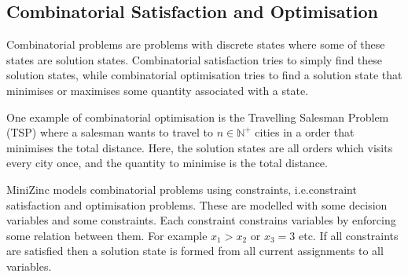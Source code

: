 \documentclass[a4paper,12pt]{article}
\newcommand{\elnaturale}{\mathbb{N}}
\begin{document}


\subsection{Combinatorial Satisfaction and Optimisation}\label{sec:csp}%
Combinatorial problems are problems with discrete states where some of these states are
solution states. Combinatorial satisfaction tries to simply find these solution states,
while combinatorial optimisation tries to find a solution state that minimises or
maximises some quantity associated with a state.

One example of combinatorial optimisation is the Travelling Salesman Problem (TSP) where a
salesman wants to travel to $n \in \elnaturale^+$ cities in a order that minimises the total
distance. Here, the solution states are all orders which visits every city once, and the
quantity to minimise is the total distance.

MiniZinc models combinatorial problems using constraints, i.e.\@ constraint satisfaction
and optimisation problems. These are modelled with some decision variables and some
constraints. Each constraint constrains variables by enforcing some relation between them.
For example $x_1 > x_2$ or $x_3 = 3$ etc. If all constraints are satisfied then a
solution state is formed from all current assignments to all variables.
\end{document}
